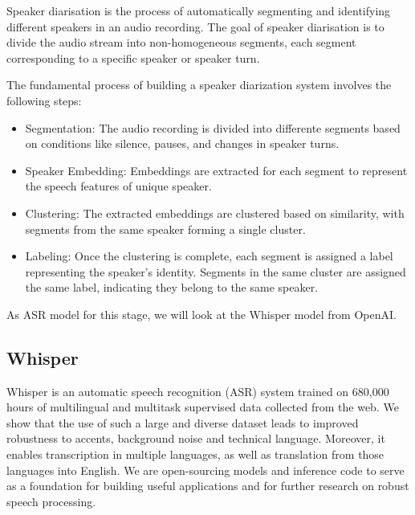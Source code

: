 \documentclass[PMI,VKR]{HSEUniversity}
\begin{document}
Speaker diarisation is the process of automatically segmenting and identifying different speakers in an audio recording. 
The goal of speaker diarisation is to divide the audio stream into non-homogeneous segments, each segment corresponding to a specific speaker or speaker turn.

The fundamental process of building a speaker diarization system involves the following steps:

\begin{itemize}
    \item Segmentation: The audio recording is divided into differente segments based on conditions like silence, pauses, and changes in speaker turns.
    \item Speaker Embedding: Embeddings are extracted for each segment to represent the speech features of unique speaker.
    \item Clustering: The extracted embeddings are clustered based on similarity, with segments from the same speaker forming a single cluster.
    \item Labeling: Once the clustering is complete, each segment is assigned a label representing the speaker's identity. Segments in the same cluster are assigned the same label, indicating they belong to the same speaker.
\end{itemize}

As ASR model for this stage, we will look at the Whisper \cite{whisper:2022} model from OpenAI.

\subsection{Whisper}

Whisper is an automatic speech recognition (ASR) system trained on 680,000 hours of multilingual and multitask supervised data collected from the web. 
We show that the use of such a large and diverse dataset leads to improved robustness to accents, background noise and technical language. Moreover, it enables transcription in multiple languages, as well as translation from those languages into English. 
We are open-sourcing models and inference code to serve as a foundation for building useful applications and for further research on robust speech processing.
\end{document}
